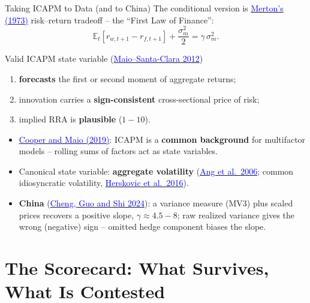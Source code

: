 \documentclass{beamer}
\newcommand{\E}{\mathbb{E}}
\begin{document}
\begin{frame}{Taking ICAPM to Data (and to China)}
The conditional version is \href{https://doi.org/10.2307/1913811}{\textcolor{blue}{Merton's (1973)}} risk--return tradeoff -- the ``First Law of Finance'':
\begin{equation*}
  \E_t[r_{w,t+1}-r_{f,t+1}]+\frac{\sigma_m^2}{2}=\gamma\,\sigma_m^2 .
\end{equation*}
\begin{block}{Valid ICAPM state variable (\href{https://doi.org/10.1016/j.jfineco.2012.07.001}{\textcolor{blue}{Maio--Santa-Clara 2012}})}
\begin{enumerate}
  \item \textbf{forecasts} the first or second moment of aggregate returns;
  \item innovation carries a \textbf{sign-consistent} cross-sectional price of risk;
  \item implied RRA is \textbf{plausible} ($1\!-\!10$).
\end{enumerate}
\end{block}
\begin{itemize}
  \item \href{https://doi.org/10.1017/S0022109018001606}{\textcolor{blue}{Cooper and Maio (2019)}}: ICAPM is a \textbf{common background} for multifactor models -- rolling sums of factors act as state variables.
  \item Canonical state variable: \textbf{aggregate volatility} (\href{https://doi.org/10.1111/j.1540-6261.2006.00836.x}{\textcolor{blue}{Ang et al.\ 2006}}; common idiosyncratic volatility, \href{https://doi.org/10.1016/j.jfineco.2015.09.010}{\textcolor{blue}{Herskovic et al.\ 2016}}).
  \item \textbf{China} (\href{https://www.sciencedirect.com/science/article/pii/S0378426624000372}{\textcolor{blue}{Cheng, Guo and Shi 2024}}): a variance measure (MV3) plus scaled prices recovers a positive slope, $\gamma\approx4.5\!-\!8$; \alert{raw realized variance gives the wrong (negative) sign} -- omitted hedge component biases the slope.
\end{itemize}
\end{frame}

\section{The Scorecard: What Survives, What Is Contested}
\end{document}
